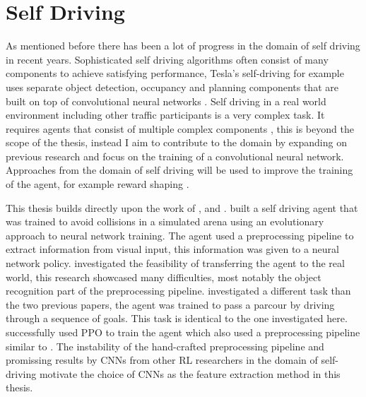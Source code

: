 

\section{Self Driving}

As mentioned before there has been a lot of progress in the domain of self driving in recent years. Sophisticated self driving algorithms often consist of many components to achieve satisfying performance, Tesla's self-driving for example uses separate object detection, occupancy and planning components that are built on top of convolutional neural networks \autocite{howteslaautopilot}. %
Self driving in a real world environment including other traffic participants is a very complex task. It requires agents that consist of multiple complex components \autocite{drl_for_ad}, this is beyond the scope of the thesis, instead I aim to contribute to the domain by expanding on previous research and focus on the training of a convolutional neural network. Approaches from the domain of self driving will be used to improve the training of the agent, for example reward shaping \autocite{drl_for_ad}.

This thesis builds directly upon the work of \autocite{jonas_koenig}, \autocite{merlin_flach} and \autocite{maximilian}. \autocite{jonas_koenig} built a self driving agent that was trained to avoid collisions in a simulated arena using an evolutionary approach to neural network training. The agent used a preprocessing pipeline to extract information from visual input, this information was given to a neural network policy. \autocite{merlin_flach} investigated the feasibility of transferring the agent to the real world, this research showcased many difficulties, most notably the object recognition part of the preprocessing pipeline. \autocite{maximilian} investigated a different task than the two previous papers, the agent was trained to pass a parcour by driving through a sequence of goals. This task is identical to the one investigated here. \autocite{maximilian} successfully used PPO to train the agent which also used a preprocessing pipeline similar to \autocite{jonas_koenig}.
The instability of the hand-crafted preprocessing pipeline and promissing results by CNNs from other RL researchers in the domain of self-driving \autocite{neptune} motivate the choice of CNNs as the feature extraction method in this thesis. 



